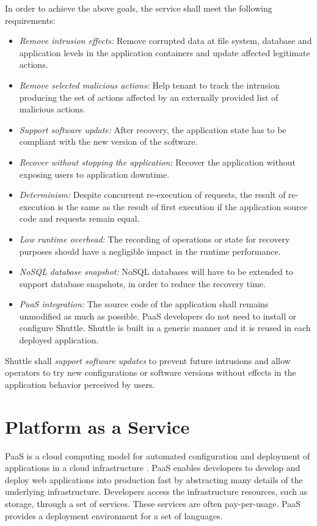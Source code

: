 In order to achieve the above goals, the service shall meet the following requirements: 
\begin{itemize}
\item \textit{Remove intrusion effects:} Remove corrupted data at file system, database and application levels in the application containers and update affected legitimate actions. 
\item \textit{Remove selected malicious actions:} Help tenant to track the intrusion producing the set of actions affected by an externally provided list of malicious actions.
\item \textit{Support software update:} After recovery, the application state has to be compliant with the new version of the software.
\item \textit{Recover without stopping the application:} Recover the application without exposing users to application downtime.
\item \textit{Determinism:} Despite concurrent re-execution of requests, the result of re-execution is the same as the result of first execution if the application source code and requests remain equal.
\item \textit{Low runtime overhead:} The recording of operations or state for recovery purposes should have a negligible impact in the runtime performance.
\item \textit{\acs{NoSQL} database snapshot:} \acs{NoSQL} databases will have to be extended to support database snapshots, in order to reduce the recovery time.
\item \textit{\ac{PaaS} integration:} The source code of the application shall remains unmodified as much as possible. \ac{PaaS} developers do not need to install or configure Shuttle. Shuttle is built in a generic manner and it is reused in each deployed application.
\end{itemize}

Shuttle shall \textit{support software updates} to prevent future intrusions and allow operators to try new configurations or software versions without effects in the application behavior perceived by users. 


\section{Platform as a Service}
\label{sec:arch:paas}
\ac{PaaS} is a cloud computing model for automated configuration and deployment of applications in a cloud infrastructure \cite{Vaquero2008,Vaquero2011,Armbrust,Mell}. \ac{PaaS} enables developers to develop and deploy web applications into production fast by abstracting many details of the underlying infrastructure. Developers access the infrastructure resources, such as storage, through a set of services. These services are often pay-per-usage. \ac{PaaS} provides a deployment environment for a set of languages. 

